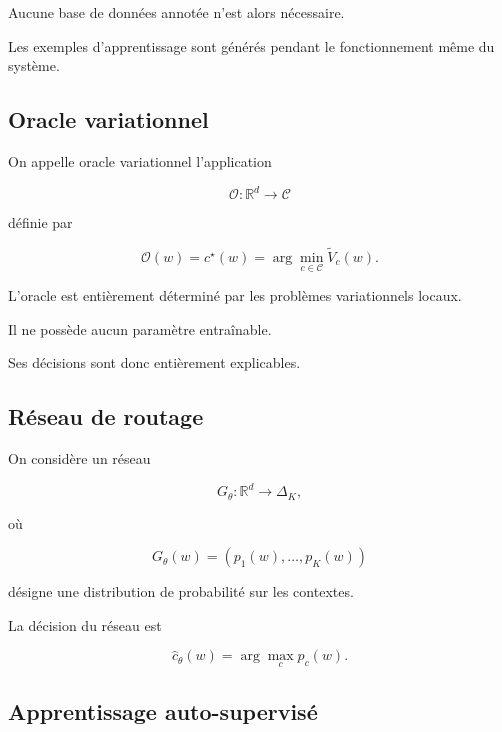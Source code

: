 Aucune base de données annotée n'est alors nécessaire.

Les exemples d'apprentissage sont générés pendant le fonctionnement même
du système.


\subsection{Oracle variationnel}

\begin{definition}

On appelle oracle variationnel l'application

\[
\mathcal O :
\mathbb R^d
\rightarrow
\mathcal C
\]

définie par

\[
\boxed{
\mathcal O(w)
=
c^\star(w)
=
\arg\min_{c\in\mathcal C}
\widetilde V_c(w).
}
\]

\end{definition}

L'oracle est entièrement déterminé par les problèmes variationnels locaux.

Il ne possède aucun paramètre entraînable.

Ses décisions sont donc entièrement explicables.


\subsection{Réseau de routage}

On considère un réseau

\[
G_\theta :
\mathbb R^d
\longrightarrow
\Delta_K,
\]

où

\[
G_\theta(w)
=
(p_1(w),\ldots,p_K(w))
\]

désigne une distribution de probabilité sur les contextes.

La décision du réseau est

\[
\widehat c_\theta(w)
=
\arg\max_c p_c(w).
\]


\subsection{Apprentissage auto-supervisé}

